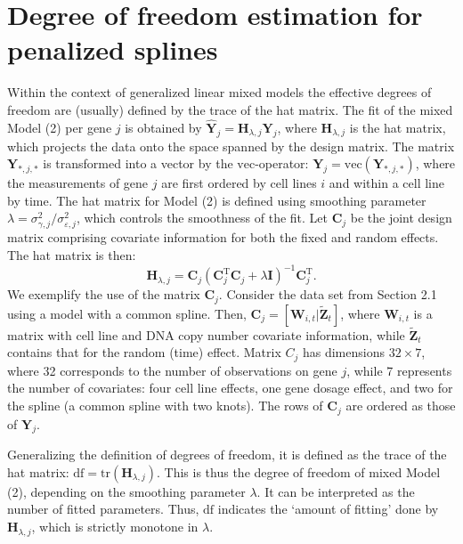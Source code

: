 \newpage
\section{Degree of freedom estimation for penalized splines}
Within the context of generalized linear mixed models the effective degrees of freedom are (usually) defined by the trace of the hat matrix. The fit of the mixed Model (2) per gene $j$ is obtained by $\hat{\mathbf{Y}}_{j}=\mathbf{H}_{\lambda,j}\mathbf{Y}_{j}$, where $\mathbf{H}_{\lambda,j}$ is the hat matrix, which projects the data onto the space spanned by the design matrix. The matrix $\mathbf{Y}_{*,j,*}$ is transformed into a vector by the $\mbox{vec}$-operator: $\mathbf{Y}_j=\mbox{vec}(\mathbf{Y}_{*,j,*})$, where the measurements of gene $j$ are first ordered by cell lines $i$ and within a cell line by time. The hat matrix for Model (2) is defined using smoothing parameter $\lambda= \sigma_{\gamma,j}^2 / \sigma_{\varepsilon,j}^2$, which controls the smoothness of the fit. Let  $\mathbf{C}_j$ be the joint design matrix comprising covariate information for both the fixed and random effects. The hat matrix is then:
\[
\mathbf{H}_{\lambda,j}=\mathbf{C}_j\left(\mathbf{C}_j^\mathrm{T}\mathbf{C}_j+\lambda \mathbf{I}\right)^{-1}\mathbf{C}_j^\mathrm{T}.
\]
We exemplify the use of the matrix $\mathbf{C}_j$. Consider the data set from Section 2.1 using a model with a common spline. Then, $\mathbf{C}_{j}= [\mathbf{W}_{i,t}|\tilde{\mathbf{Z}}_t ]$, where $\mathbf{W}_{i,t}$ is a matrix with cell line and DNA copy number covariate information, while  $\tilde{\mathbf{Z}}_t$ contains that for the random (time) effect. Matrix $C_j$ has dimensions $32\times7$, where 32 corresponds to the number of observations on gene $j$, while 7 represents the number of covariates: four cell line effects, one gene dosage effect, and two for the spline (a common spline with two knots). The rows of $\mathbf{C}_j$ are ordered as those of $\mathbf{Y}_j$.


Generalizing the definition of degrees of freedom, it is defined as the trace of the hat matrix: $\mbox{df} =  \mbox{tr}(\mathbf{H}_{\lambda,j})$.
This is thus the degree of freedom of mixed Model (2), depending on the smoothing parameter $\lambda$. It can be interpreted as the number of fitted parameters. Thus, $\mbox{df}$ indicates the `amount of fitting' done by $\mathbf{H}_{\lambda,j}$, which is strictly monotone in $\lambda$.


\newpage
